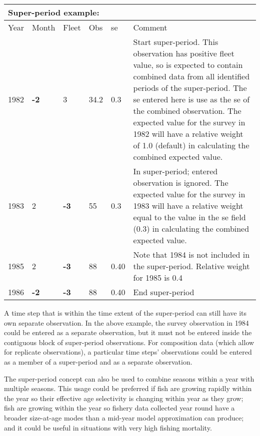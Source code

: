 \begin{center}
	\vspace*{-\baselineskip}
	\begin{tabular}{p{1cm} p{1cm} p{1cm} p{1cm} p{1cm} p{9cm}}
		\multicolumn{6}{l}{Super-period example:} \\
		\hline
		Year & Month & Fleet & Obs & \gls{se} & Comment \Tstrut\Bstrut\\
		\hline
		1982 \Tstrut & \textbf{-2} & 3 & 34.2 & 0.3 & Start super-period. This observation has positive fleet value, so is expected to contain combined data from all identified periods of the super-period. The \gls{se} entered here is use as the \gls{se} of the combined observation. The expected value for the survey in 1982 will have a relative weight of 1.0 (default) in calculating the combined expected value.\Bstrut\\
		\hline
		1983 \Tstrut & 2 & \textbf{-3} & 55 & 0.3 & In super-period; entered observation is ignored. The expected value for the survey in 1983 will have a relative weight equal to the value in the \gls{se} field (0.3) in calculating the combined expected value. \Bstrut\\
		\hline
		1985 \Tstrut & 2 & \textbf{-3}& 88 & 0.40 & Note that 1984 is not included in the super-period. Relative weight for 1985 is 0.4 \Bstrut\\
		\hline
		1986 & \textbf{-2} & \textbf{-3} & 88 & 0.40 & End super-period \Tstrut\Bstrut\\
		\hline
	\end{tabular}
	\leavevmode\tagmcend\tagstructend\par
\end{center}

A time step that is within the time extent of the super-period can still have its own separate observation. In the above example, the survey observation in 1984 could be entered as a separate observation, but it must not be entered inside the contiguous block of super-period observations. For composition data (which allow for replicate observations), a particular time steps' observations could be entered as a member of a super-period and as a separate observation.

The super-period concept can also be used to combine seasons within a year with multiple seasons. This usage could be preferred if fish are growing rapidly within the year so their effective age selectivity is changing within year as they grow; fish are growing within the year so fishery data collected year round have a broader size-at-age modes than a mid-year model approximation can produce; and it could be useful in situations with very high fishing mortality.

\pagebreak
